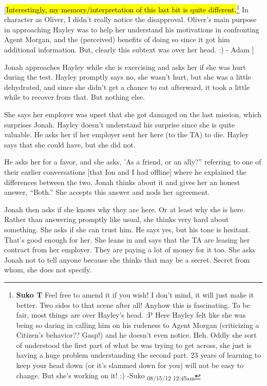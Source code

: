 {[}\hl{Interestingly, my memory/interpretation of this last bit is quite different.}\footnote{\textbf{Suko T }Feel free to amend it if you wish!  I don't mind, it will just make it better.  Two sides to that scene after all!  Anyhow this is fascinating.  To be fair, most things are over Hayley's head. :P  Here Hayley felt like she was being so daring in calling him on his rudeness to Agent Morgan (criticizing a Citizen's behavior?? Gasp!) and he doesn't even notice.  Heh.  Oddly she sort of understood the first part of what he was trying to get across, she just is having a huge problem understanding the second part.  23 years of learning to keep your head down (or it's slammed down for you) will not be easy to change.  But she's working on it! :)  -Suko \textsubscript{08/15/12 12:45am}} In character as Oliver, I didn't really notice the disapproval.  Oliver's main purpose in approaching Hayley was to help her understand his motivations in confronting Agent Morgan, and the (perceived) benefits of doing so since it got him additional information.  But, clearly this subtext was over her head. :)  - Adam {]}



Jonah approaches Hayley while she is exercising and asks her if she was hurt during the test.  Hayley promptly says no, she wasn't hurt, but she was a little dehydrated, and since she didn't get a chance to eat afterward, it took a little while to recover from that.  But nothing else.



She says her employer was upset that she got damaged on the last mission, which surprises Jonah.  Hayley doesn't understand his surprise since she is quite valuable.  He asks her if her employer sent her here (to the TA) to die.  Hayley says that she could have, but she did not. 



He asks her for a favor, and she asks, 'As a friend, or an ally?'' referring to one of their earlier conversations {[}that Ion and I had offline{]} where he explained the differences between the two.  Jonah thinks about it and gives her an honest answer, ``Both.''  She accepts this answer and nods her agreement.



Jonah then asks if she knows why they are here.  Or at least why she is here.  Rather than answering promptly like usual, she thinks very hard about something.  She asks if she can trust him.  He says yes, but his tone is hesitant.  That's good enough for her.  She leans in and says that the TA are leasing her contract from her employer.  They are paying a lot of money for it too.  She asks Jonah not to tell anyone because she thinks that may be a secret.  Secret from whom, she does not specify.




